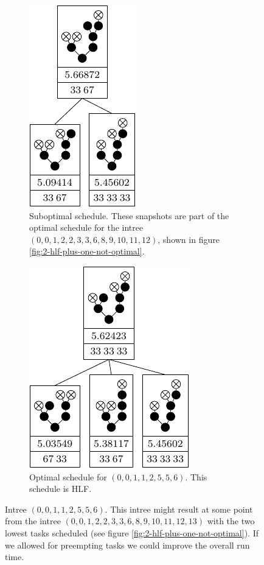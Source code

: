 \begin{figure}[ht]
  \centering
  \begin{subfigure}{.46\textwidth}
    \centering
    \includegraphics{p3/preemtive/00112556subopt.pdf}
    \caption{Suboptimal schedule. These snapshots are part of the optimal schedule for the intree $(0,0,1,2,2,3,3,6,8,9,10,11,12)$, shown in figure \ref{fig:2-hlf-plus-one-not-optimal}.}
    \label{fig:preemtive-better-bad-case}
  \end{subfigure}
  \quad
  \begin{subfigure}{.46\textwidth}
    \centering
    \includegraphics{p3/preemtive/00112556opt.pdf}
    \caption{Optimal schedule for $(0,0,1,1,2,5,5,6)$. This schedule is HLF.}
    \label{fig:preemtive-better-good-case}
  \end{subfigure}
  \caption{Intree $(0,0,1,1,2,5,5,6)$. This intree might result at some point from the intree $(0,0,1,2,2,3,3,6,8,9,10,11,12,13)$ with the two lowest tasks scheduled (see figure \ref{fig:2-hlf-plus-one-not-optimal}). If we allowed for preempting tasks we could improve the overall run time.}
  \label{fig:preemtive-is-better}
\end{figure}

